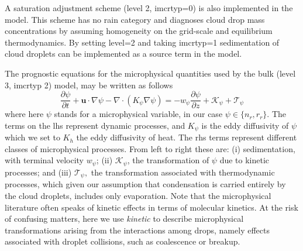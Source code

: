 \documentclass[11pt,a4paper]{article}
\begin{document}
A saturation adjustment scheme (level 2, imcrtyp=0) is also
implemented in the model.  This scheme has no rain category and
diagnoses cloud drop mass concentrations by assuming homogeneity on
the grid-scale and equilibrium thermodynamics.  By setting level=2 and
taking imcrtyp=1 sedimentation of cloud droplets can be implemented as
a source term in the model.

The prognostic equations for the microphysical quantities used by the
bulk (level 3, imcrtyp 2) model, may be written as follows
\begin{equation}
\frac{\partial \psi}{\partial t} + \mathbf{u}\cdot \nabla\psi - \nabla
\cdot \left(K_\psi \nabla \psi \right)= -w_{\psi} \frac{\partial
\psi}{\partial z} + \mathcal{K}_{\psi} + \mathcal{T}_{\psi}
\label{eq:psi}
\end{equation}
where here $\psi$ stands for a microphysical variable, in our case
$\psi\in\{n_r,r_r\}$. The terms on the lhs represent dynamic
processes, and $K_{\psi}$ is the eddy diffusivity of $\psi$ which we
set to $K_h$ the eddy diffusivity of heat. The rhs terms represent
different classes of microphysical processes.  From left to right
these are: (i) sedimentation, with terminal velocity $w_\psi$; (ii)
$\mathcal{K}_\psi$, the transformation of $\psi$ due to kinetic
processes; and (iii) $\mathcal{T}_\psi,$ the transformation associated
with thermodynamic processes, which given our assumption that
condensation is carried entirely by the cloud droplets, includes only
evaporation.  Note that the microphysical literature often speaks of
kinetic effects in terms of molecular kinetics.  At the risk of
confusing matters, here we use \emph{kinetic} to describe
microphysical transformations arising from the interactions among
drops, namely effects associated with droplet collisions, such as
coalescence or breakup.
\end{document}
